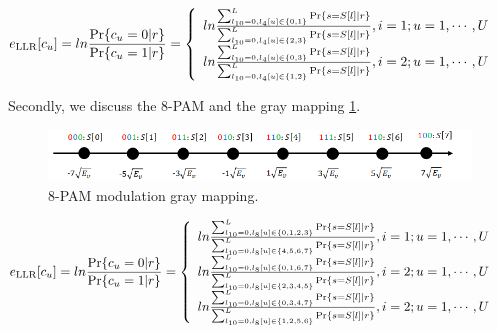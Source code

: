 \begin{equation}
e_{\text{LLR}}[c_u] = ln \frac{\text{Pr}\{c_u=0|r\}}{\text{Pr}\{c_u=1|r\}} 
\nonumber \\ = 
\left\{
             \begin{array}{lr}
             ln \frac{\sum_{l_{10}=0, l_{4}[u]\in\{0,1\}}^{L}\text{Pr}\{s=S[l]|r\}}{\sum_{l_{10}=0, l_{4}[u]\in\{2,3\}}^{L}\text{Pr}\{s=S[l]|r\}}, i = 1; u=1,\cdots, U &  \\
             ln \frac{\sum_{l_{10}=0, l_{4}[u]\in\{0,3\}}^{L}\text{Pr}\{s=S[l]|r\}}{\sum_{l_{10}=0, l_{4}[u]\in\{1,2\}}^{L}\text{Pr}\{s=S[l]|r\}},
i = 2; u=1,\cdots, U & \\ 
             \end{array}
\right.
\end{equation}

Secondly, we discuss the 8-PAM and the gray mapping \ref{fig:8_pam_gray_mapping}. 

\begin{figure}
\centering
\includegraphics[width=17cm]{fig/8_pam_gray_mapping.png}
\caption{8-PAM modulation gray mapping.}
\label{fig:8_pam_gray_mapping}
\end{figure}

\begin{equation}
e_{\text{LLR}}[c_u] = ln \frac{\text{Pr}\{c_u=0|r\}}{\text{Pr}\{c_u=1|r\}} 
\nonumber \\ = 
\left\{
             \begin{array}{lr}
             ln \frac{\sum_{l_{10}=0, l_{8}[u]\in\{0,1,2,3\}}^{L}\text{Pr}\{s=S[l]|r\}}{\sum_{l_{10}=0, l_{8}[u]\in\{4,5,6,7\}}^{L}\text{Pr}\{s=S[l]|r\}}, i = 1; u=1,\cdots, U &  \\
             ln \frac{\sum_{l_{10}=0, l_{8}[u]\in\{0,1,6,7\}}^{L}\text{Pr}\{s=S[l]|r\}}{\sum_{l_{10}=0, l_{8}[u]\in\{2,3,4,5\}}^{L}\text{Pr}\{s=S[l]|r\}},
i = 2; u=1,\cdots, U & \\
			ln \frac{\sum_{l_{10}=0, l_{8}[u]\in\{0,3,4,7\}}^{L}\text{Pr}\{s=S[l]|r\}}{\sum_{l_{10}=0, l_{8}[u]\in\{1,2,5,6\}}^{L}\text{Pr}\{s=S[l]|r\}},
i = 2; u=1,\cdots, U & \\ 
             \end{array}
\right.
\end{equation}


